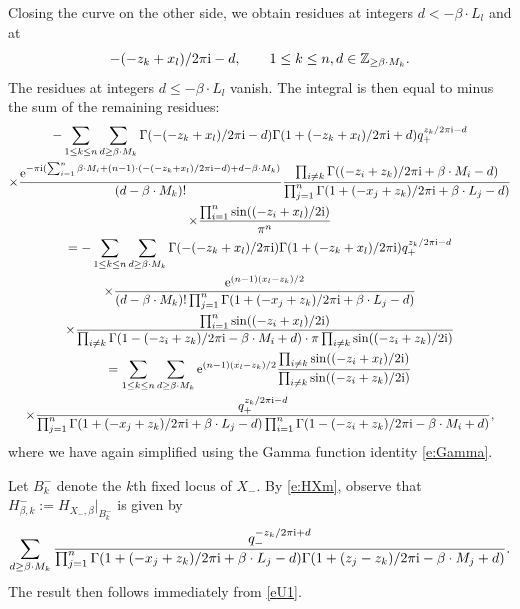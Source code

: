 \documentclass[pdftex]{sigma}
\numberwithin{equation}{section}
\newcommand{\ZZ}{\mathbb{Z}}
\newcommand{\MB}{M}
\newcommand{\LB}{L}
\newcommand{\z}{z}
\newcommand{\x}{x}
\begin{document}
Closing the curve on the other side, we obtain residues at integers $d < -\beta \cdot \LB_l$ and at
\[
- (-\z_k+\x_l)/2 \pi {\rm i} - d,\qquad 1 \leq k \leq n, d \in \ZZ_{\geq \beta \cdot \MB_k}.
\]
The residues at integers $d \leq -\beta \cdot \LB_l$ vanish. The integral is then equal to minus the sum of the remaining residues:
\begin{gather*} %
 -\sum_{1 \leq k \leq n}
\sum_{d \geq \beta \cdot \MB_k}\Gamma(- (-\z_k+\x_l)/2 \pi {\rm i} -d) \Gamma(1 + (-\z_k+\x_l)/2 \pi {\rm i} + d) q_+^{ \z_k/2 \pi {\rm i}-d } \\ \nonumber
\times
\frac{ {\rm e}^{- \pi {\rm i} ( \sum_{i=1}^n \beta \cdot \MB_i + (n-1)\cdot ( - (-\z_k+\x_l)/2 \pi {\rm i} - d)+d- \beta \cdot \MB_k)}}{(d - \beta \cdot \MB_k)!}\frac{\prod_{i\neq k} \Gamma((-\z_i + \z_k)/2 \pi {\rm i} + \beta \cdot \MB_i -d)}
{\prod_{j=1}^n \Gamma(1 + (- \x_j+\z_k)/2 \pi {\rm i} + \beta \cdot \LB_j -d) }\\ \nonumber
\times
 \frac{ \prod_{i=1}^n \sin( (-\z_i+\x_l)/2 {\rm i}) }{\pi^n}
 \\ \nonumber
= -\sum_{1 \leq k \leq n}
\sum_{d \geq \beta \cdot \MB_k}\Gamma(- (-\z_k+\x_l)/2 \pi {\rm i} ) \Gamma(1 + (-\z_k+\x_l)/2 \pi {\rm i}) q_+^{ \z_k/2 \pi {\rm i}-d } \\ \nonumber
\times
\frac{ {\rm e}^{ (n-1) ( \x_l-\z_k)/2}}
{(d - \beta \cdot \MB_k)!\prod_{j=1}^n \Gamma(1 + (- \x_j+\z_k)/2 \pi {\rm i} + \beta \cdot \LB_j -d) }\\ \nonumber
\times
 \frac{ \prod_{i=1}^n \sin( (-\z_i+\x_l)/2 {\rm i}) }{\prod_{i \neq k} \Gamma(1 - (-\z_i +\z_k)/2 \pi {\rm i} - \beta \cdot \MB_i + d) \cdot \pi \prod_{i \neq k}\sin((-\z_i + \z_k)/2 {\rm i})}
\\ \nonumber
 = \sum_{1 \leq k \leq n}
\sum_{d \geq \beta \cdot \MB_k} {\rm e}^{ (n-1) ( \x_l-\z_k)/2}\frac{ \prod_{i\neq k} \sin( (-\z_i+\x_l)/2 {\rm i}) }{\prod_{i \neq k}\sin((-\z_i + \z_k)/2 {\rm i})} \\
\times
\frac{q_+^{ \z_k/2 \pi {\rm i}-d } }
{\prod_{j=1}^n \Gamma(1 + (- \x_j+\z_k)/2 \pi {\rm i} + \beta \cdot \LB_j -d) \prod_{i =1}^n \Gamma(1 - (-\z_i +\z_k)/2 \pi {\rm i} - \beta \cdot \MB_i + d)}, \nonumber
\end{gather*}
where we have again simplified using the Gamma function identity \eqref{e:Gamma}.

Let $B_k^{-}$ denote the $k$th fixed locus of $X_{-}$. By \eqref{e:HXm}, observe
that $H_{\beta, k}^{-} := H_{X_{-}, \beta}|_{B_k^{-}}$ is given by
\[
\sum_{d \geq \beta \cdot \MB_k} \frac{ q_-^{-\z_k/2 \pi {\rm i}+d}}
{\prod_{j=1}^n \Gamma(1 + (- \x_j +\z_k)/2 \pi {\rm i} + \beta \cdot \LB_j-d)\Gamma(1 + (\z_j -\z_k)/2 \pi {\rm i} - \beta \cdot \MB_j + d)}.
\]
The result then follows immediately from \eqref{eU1}.
\end{document}
